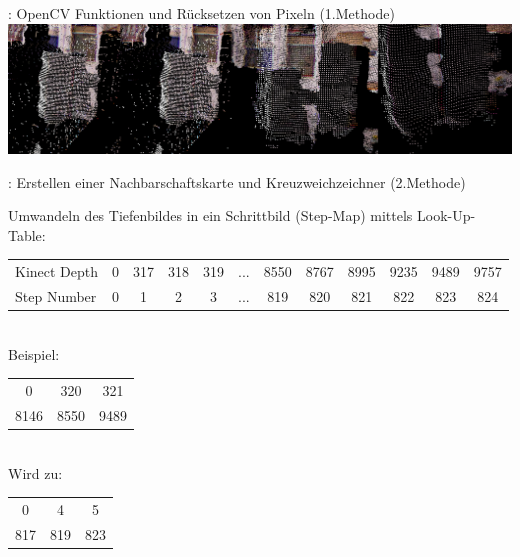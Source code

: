 \documentclass{VLKlauck}
\begin{document}
	\begin{frame}{\insertsubsection: OpenCV Funktionen und Rücksetzen von Pixeln (1.Methode)}
			\includegraphics[width=\textwidth]{myFilter1.png}
	\end{frame}
	 
	 	
	\begin{frame}{\insertsubsection: Erstellen einer Nachbarschaftskarte und Kreuzweichzeichner (2.Methode)}

	Umwandeln des Tiefenbildes in ein Schrittbild (Step-Map) mittels Look-Up-Table:\\[0.5cm]
	{
	\tiny
		  \begin{tabular}{lccccccccccc}
			Kinect Depth& 0 & 317 & 318 & 319 &  ...  & 8550 & 8767 & 8995 & 9235 & 9489 & 9757\\
			Step Number & 0 &   1 &   2 &   3 &  ...  &  819 &  820 &  821 &  822 & 823  & 824\\
		  \end{tabular}
	}\\[0.5cm]

			Beispiel:\\
			\begin{tabular}{ccc} 
			0 & 320 & 321\\
			8146 & 8550 & 9489\\
			\end{tabular}\\[0.5cm]

			Wird zu:\\
			\begin{tabular}{ccc}
			0 & 4 & 5\\
			817 & 819 & 823\\
			\end{tabular}
	\end{frame}
	 
\end{document}
